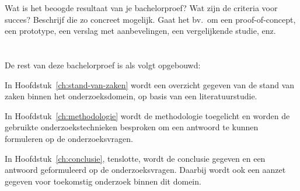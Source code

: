 Wat is het beoogde resultaat van je bachelorproef? Wat zijn de criteria voor succes? Beschrijf die zo concreet mogelijk. Gaat het bv.\ om een proof-of-concept, een prototype, een verslag met aanbevelingen, een vergelijkende studie, enz.

\section{}%
\label{sec:opzet-bachelorproef}


De rest van deze bachelorproef is als volgt opgebouwd:

In Hoofdstuk~\ref{ch:stand-van-zaken} wordt een overzicht gegeven van de stand van zaken binnen het onderzoeksdomein, op basis van een literatuurstudie.

In Hoofdstuk~\ref{ch:methodologie} wordt de methodologie toegelicht en worden de gebruikte onderzoekstechnieken besproken om een antwoord te kunnen formuleren op de onderzoeksvragen.


In Hoofdstuk~\ref{ch:conclusie}, tenslotte, wordt de conclusie gegeven en een antwoord geformuleerd op de onderzoeksvragen. Daarbij wordt ook een aanzet gegeven voor toekomstig onderzoek binnen dit domein.